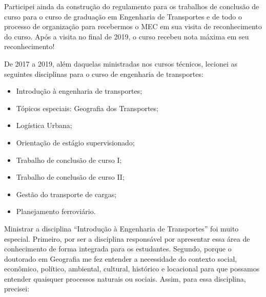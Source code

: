 \documentclass[
]{book}
\begin{document}
Participei ainda da construção do regulamento para os trabalhos de
conclusão de curso para o curso de graduação em Engenharia de
Transportes e de todo o processo de organização para recebermos o MEC em
sua visita de reconhecimento do curso. Após a visita no final de 2019, o
curso recebeu nota máxima em seu reconhecimento!

De 2017 a 2019, além daquelas ministradas nos cursos técnicos, lecionei
as seguintes disciplinas para o curso de engenharia de transportes:

\begin{itemize}
\item
  Introdução à engenharia de transportes;
\item
  Tópicos especiais: Geografia dos Transportes;
\item
  Logística Urbana;
\item
  Orientação de estágio supervisionado;
\item
  Trabalho de conclusão de curso I;
\item
  Trabalho de conclusão de curso II;
\item
  Gestão do transporte de cargas;
\item
  Planejamento ferroviário.
\end{itemize}

Ministrar a disciplina ``Introdução à Engenharia de Transportes'' foi
muito especial. Primeiro, por ser a disciplina responsável por
apresentar essa área de conhecimento de forma integrada para os
estudantes. Segundo, porque o doutorado em Geografia me fez entender a
necessidade do contexto social, econômico, político, ambiental,
cultural, histórico e locacional para que possamos entender quaisquer
processos naturais ou sociais. Assim, para essa disciplina, precisei:
\end{document}
